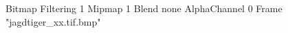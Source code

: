 {Bitmap
	{Filtering 1}
	{Mipmap 1}
	{Blend none}
	{AlphaChannel 0}
	{Frame "jagdtiger_xx.tif.bmp"}
}
